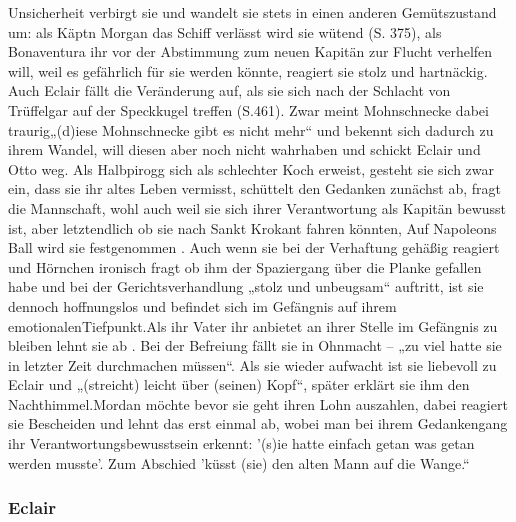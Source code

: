Unsicherheit verbirgt sie und  wandelt sie stets in einen anderen Gemütszustand um: als Käptn Morgan das Schiff 
verlässt wird sie wütend (S. 375), als Bonaventura ihr vor der Abstimmung zum neuen Kapitän zur Flucht verhelfen 
will, weil es gefährlich für sie werden könnte, reagiert sie stolz und hartnäckig.\cite[S.378f]{pir} Auch Eclair fällt 
die Veränderung auf, als sie sich nach der Schlacht von Trüffelgar auf der Speckkugel treffen (S.461). Zwar meint 
Mohnschnecke dabei traurig„(d)iese Mohnschnecke gibt es nicht mehr“\cite[S.463]{pir} und bekennt sich dadurch zu ihrem Wandel, 
will diesen aber noch nicht wahrhaben und schickt Eclair und Otto weg.\cite[S.463f]{pir} Als Halbpirogg sich als schlechter 
Koch erweist,\cite[S.218ff]{pir} gesteht sie sich zwar ein, dass sie ihr altes Leben vermisst, schüttelt den Gedanken 
zunächst ab,\cite[S.521f]{pir} fragt die Mannschaft, wohl auch weil sie sich ihrer Verantwortung als Kapitän bewusst ist, 
aber letztendlich ob sie nach Sankt Krokant fahren könnten,\cite[S.529]{pir} Auf Napoleons Ball wird sie festgenommen \cite[S.551]{pir}. 
Auch wenn sie bei der Verhaftung gehäßig reagiert und Hörnchen ironisch fragt ob ihm der Spaziergang über die Planke gefallen habe \cite[S.522]{pir} und bei der Gerichtsverhandlung „stolz und 
unbeugsam“ \cite[S.573]{pir} auftritt, ist sie dennoch hoffnungslos und befindet sich im Gefängnis auf ihrem emotionalenTiefpunkt.\cite[S.561]{pir}Als ihr Vater ihr anbietet an ihrer Stelle im Gefängnis zu bleiben lehnt sie ab \cite[S.562]{pir}. Bei der Befreiung fällt sie in Ohnmacht – „zu viel hatte sie in letzter Zeit durchmachen müssen“\cite[S.617]{pir}. Als sie wieder aufwacht ist sie liebevoll zu Eclair und „(streicht) leicht über (seinen) Kopf“, später erklärt sie ihm den Nachthimmel.\cite[S.631]{pir}Mordan möchte bevor sie geht ihren Lohn auszahlen, dabei reagiert sie Bescheiden und lehnt das erst einmal ab, wobei man bei ihrem Gedankengang ihr Verantwortungsbewusstsein  erkennt: \cite[S.638]{pir} '(s)ie hatte einfach getan was getan werden musste'.\cite[S.638]{pir} Zum Abschied 'küsst (sie) den alten Mann auf die Wange.“\cite[S.638]{pir}

\subsubsection{Eclair}


